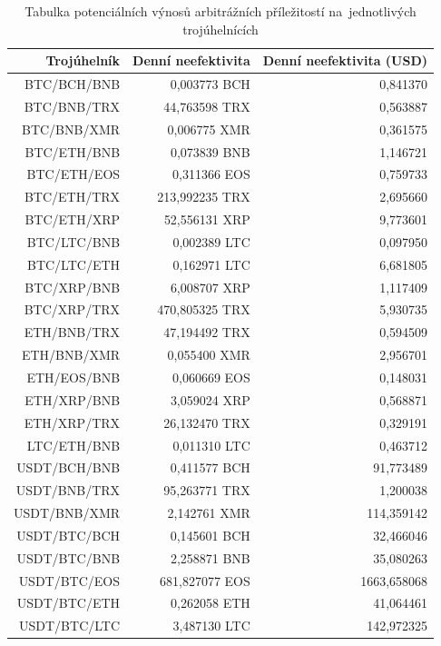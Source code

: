 \documentclass[thesis=B,czech]{FITthesis}[2019/03/21]
\begin{document}
\begin{table}\centering
\caption{Tabulka potenciálních výnosů arbitrážních příležitostí na~jednotlivých trojúhelnících}
\label{table_gains}
\begin{tabular}{|| r | r | r ||}\hline Trojúhelník & Denní neefektivita & Denní neefektivita (USD)\\ [0.5ex]
 \hline\hline BTC/BCH/BNB & 0,003773 BCH & 0,841370\\ 
 \hline BTC/BNB/TRX & 44,763598 TRX & 0,563887\\ 
 \hline BTC/BNB/XMR & 0,006775 XMR & 0,361575\\ 
 \hline BTC/ETH/BNB & 0,073839 BNB & 1,146721\\ 
 \hline BTC/ETH/EOS & 0,311366 EOS & 0,759733\\ 
 \hline BTC/ETH/TRX & 213,992235 TRX & 2,695660\\ 
 \hline BTC/ETH/XRP & 52,556131 XRP & 9,773601\\ 
 \hline BTC/LTC/BNB & 0,002389 LTC & 0,097950\\ 
 \hline BTC/LTC/ETH & 0,162971 LTC & 6,681805\\ 
 \hline BTC/XRP/BNB & 6,008707 XRP & 1,117409\\ 
 \hline BTC/XRP/TRX & 470,805325 TRX & 5,930735\\ 
 \hline ETH/BNB/TRX & 47,194492 TRX & 0,594509\\ 
 \hline ETH/BNB/XMR & 0,055400 XMR & 2,956701\\ 
 \hline ETH/EOS/BNB & 0,060669 EOS & 0,148031\\ 
 \hline ETH/XRP/BNB & 3,059024 XRP & 0,568871\\ 
 \hline ETH/XRP/TRX & 26,132470 TRX & 0,329191\\ 
 \hline LTC/ETH/BNB & 0,011310 LTC & 0,463712\\ 
 \hline USDT/BCH/BNB & 0,411577 BCH & 91,773489\\ 
 \hline USDT/BNB/TRX & 95,263771 TRX & 1,200038\\ 
 \hline USDT/BNB/XMR & 2,142761 XMR & 114,359142\\ 
 \hline USDT/BTC/BCH & 0,145601 BCH & 32,466046\\ 
 \hline USDT/BTC/BNB & 2,258871 BNB & 35,080263\\ 
 \hline USDT/BTC/EOS & 681,827077 EOS & 1663,658068\\ 
 \hline USDT/BTC/ETH & 0,262058 ETH & 41,064461\\ 
 \hline USDT/BTC/LTC & 3,487130 LTC & 142,972325\\ 

\end{tabular}
\end{table}
\end{document}
